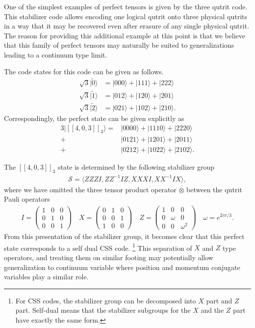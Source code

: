 \documentclass[12pt]{article}
\theoremstyle{plain}
\theoremstyle{plain}
\theoremstyle{plain}
\theoremstyle{plain}
\theoremstyle{result}
\theoremstyle{remark}
\theoremstyle{conjecture}
\theoremstyle{observation}
\theoremstyle{definition}
\theoremstyle{corollary}
\theoremstyle{definition}
\theoremstyle{definition}
\theoremstyle{assumption}
\theoremstyle{definition}
\theoremstyle{problem}
\theoremstyle{fact}
\newcommand*{\cS}{\mathcal{S}}
\begin{document}
One of the simplest examples of perfect tensors is given by the three qutrit code.
This stabilizer code allows encoding one logical qutrit onto three physical qutrits in a way that it may be recovered even after erasure of any single physical qutrit.
The reason for providing this additional example at this point is that we believe that this family of perfect tensors may naturally be suited to generalizations leading to a continuum type limit. 

The code states for this code can be given as follows.
\begin{align*}
 \sqrt{3}| \tilde{0} \rangle  & = | 000 \rangle + |111\rangle + | 222\rangle \\
  \sqrt{3}| \tilde{1} \rangle  & = | 012 \rangle + |120\rangle + | 201\rangle \\
   \sqrt{3}| \tilde{2} \rangle  & = | 021 \rangle + |102\rangle + | 210\rangle.
\end{align*}
Correspondingly, the perfect state can be given explicitly as
\begin{align*}
3| [[4,0,3]]_3 \rangle = & | 0000 \rangle + |1110\rangle + | 2220\rangle \\
                            + & | 0121 \rangle + |1201\rangle + | 2011\rangle \\
                            + &  | 0212 \rangle + |1022\rangle + | 2102\rangle.
\end{align*}

The $[[4,0,3]]_3$ state is determined by the following stabilizer group
\begin{align}
\cS = \langle ZZZI, ZZ^{-1}IZ, XXXI,  X X^{-1} IX \rangle,
\end{align}
where we have omitted the three tensor product operator $\otimes$ between the qutrit Pauli operators 
\begin{align}
I = \begin{pmatrix}
1 & 0 & 0\\
0 & 1 & 0 \\
0 & 0 & 1
\end{pmatrix}
\quad
X = \begin{pmatrix}
0 & 1 & 0\\
0 & 0 & 1 \\
1 & 0 & 0
\end{pmatrix}
\quad
Z = \begin{pmatrix}
1 & 0 & 0\\
0 & \omega & 0 \\
0 & 0 & \omega^2 
\end{pmatrix}
\quad
\omega=e^{2i\pi/3} .
\end{align}
From this presentation of the stabilizer group, it becomes clear that this perfect state corresponds to a self dual CSS code.
\footnote{For CSS codes, the stabilizer group can be decomposed into $X$ part and $Z$ part. 
Self-dual means that the stabilizer subgroups for the $X$ and the $Z$ part have exactly the same form.}
This separation of $X$ and $Z$ type operators, and treating them on similar footing may potentially allow generalization to continuum variable where position and momentum conjugate variables play a similar role.
\end{document}

